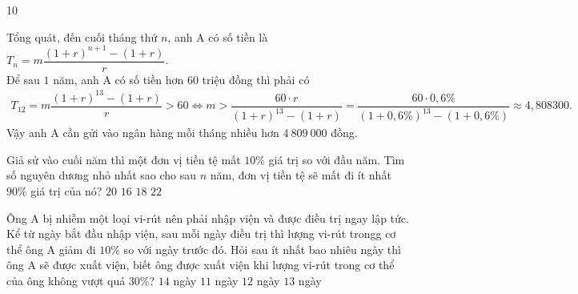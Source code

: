 \begin{indapan}{10}
\begin{ex}
{		Tổng quát, đến cuối tháng thứ $n$, anh A có số tiền là $T_n=m\dfrac{(1+r)^{n+1}-(1+r)}{r}$.\\
		Để sau $1$ năm, anh A có số tiền hơn $60$ triệu đồng thì phải có
		\allowdisplaybreaks
		\begin{eqnarray*}
			T_{12}=m\dfrac{(1+r)^{13}-(1+r)}{r}>60 \Leftrightarrow m>\dfrac{60 \cdot r}{(1+r)^{13}-(1+r)}=\dfrac{60 \cdot 0{,}6\%}{\left(1+0{,}6\%\right)^{13}-(1+0{,}6\%)} \approx 4{,}808300.
		\end{eqnarray*}
		Vậy anh A cần gửi vào ngân hàng mỗi tháng nhiều hơn $4\ 809\ 000$ đồng.
	}
\end{ex}
\begin{ex}
	Giả sử vào cuối năm thì một đơn vị tiền tệ mất $ 10\% $ giá trị so với đầu năm. Tìm số nguyên dương nhỏ nhất sao cho sau $ n $ năm, đơn vị tiền tệ sẽ mất đi ít nhất $ 90\% $ giá trị của nó?
	\choice
	{$ 20 $}
	{$ 16 $}
	{$ 18 $}
	{\True $ 22 $}
\end{ex}
\begin{ex}
	Ông A bị nhiễm một loại vi-rút nên phải nhập viện và được điều trị ngay lập tức. Kể từ ngày bắt đầu nhập viện, sau mỗi ngày điều trị thì lượng vi-rút trongg cơ thể ông A giảm đi $10\%$ so với ngày trước đó. Hỏi sau ít nhất bao nhiêu ngày thì ông A sẽ được xuất viện, biết ông được xuất viện khi lượng vi-rút trong cơ thể của ông không vượt quá $30\%$?
	\choice
	{$14$ ngày}
	{$11$ ngày}
	{\True $12$ ngày}
	{$13$ ngày}
\end{ex}

\end{indapan}
